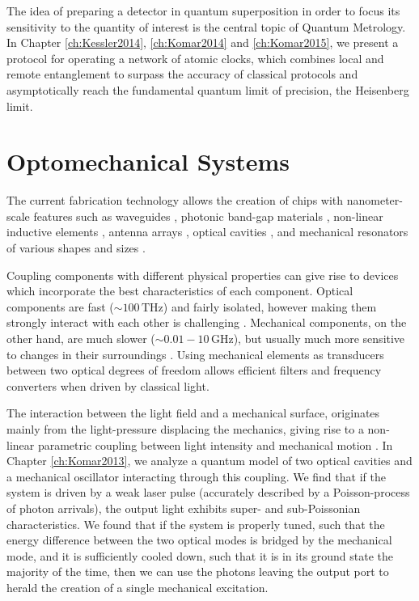 The idea of preparing a detector in quantum
superposition in order to focus its sensitivity to the quantity of interest is
the central topic of Quantum Metrology. In Chapter \ref{ch:Kessler2014},
\ref{ch:Komar2014} and \ref{ch:Komar2015}, we present a
protocol for operating a network of atomic clocks, which combines local and
remote entanglement to surpass the accuracy of classical protocols and
asymptotically reach the fundamental quantum limit of precision, the Heisenberg limit. 


 
 
 
 
 
 
\section{Optomechanical Systems}
The current fabrication technology allows the creation of chips with
nanometer-scale features such as waveguides \cite{Mekis1996}, photonic band-gap
materials \cite{Foresi1997}, non-linear inductive elements \cite{Makhlin1999},
antenna arrays \cite{Yu2014}, optical cavities \cite{Painter2001}, and
mechanical resonators of various shapes and sizes \cite{Aspelmeyer2014}.

Coupling components with different physical properties can give rise to devices
which incorporate the best characteristics of each component.
Optical components are fast ($\sim 100\,\mathrm{THz}$) and fairly isolated,
however making them strongly interact with each other is challenging
\cite{Chang2007}.
Mechanical components, on the other hand, are much slower ($\sim
0.01-10\,\mathrm{GHz}$), but usually much more sensitive to changes in their
surroundings \cite{Aspelmeyer2014}. Using mechanical elements as transducers
between two optical degrees of freedom allows efficient filters and frequency
converters \cite{Eichenfield2009} when driven by classical light.

The interaction between the light field and a mechanical surface, originates
mainly from the light-pressure displacing the mechanics, giving rise to a
non-linear parametric coupling between light intensity and mechanical motion
\cite{Meystre2013}. In Chapter \ref{ch:Komar2013}, we analyze a quantum model of
two optical cavities and a mechanical oscillator interacting through this
coupling. We find that if the system is driven by a weak laser pulse (accurately
described by a Poisson-process of photon arrivals), the output light exhibits
super- and sub-Poissonian characteristics.
We found that if the system is properly tuned, such that the energy difference
between the two optical modes is bridged by the mechanical mode, and it is
sufficiently cooled down, such that it is in its ground state the majority of
the time, then we can use the photons leaving the output port to herald the
creation of a single mechanical excitation.

